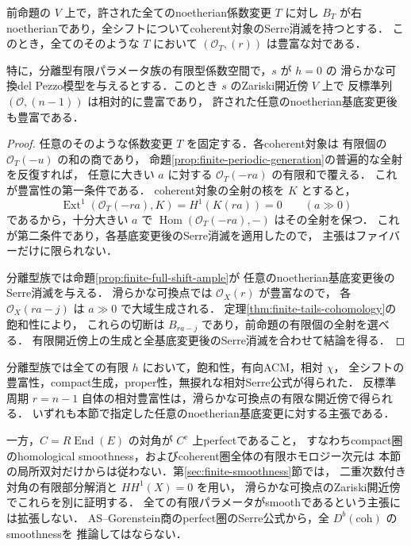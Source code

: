 \begin{corollary}[有限開近傍上の相対反標準豊富性]
\label{cor:finite-periodic-ampleness}
前命題の $V$ 上で，許された全てのnoetherian係数変更 $T$ に対し
$B_T$ が右noetherianであり，全シフトについてcoherent対象のSerre消滅を持つとする．
このとき，全てのそのような $T$ において
$(\mathcal O_T,(r))$ は豊富な対である．

特に，分離型有限パラメータ族の有限型係数空間で，$s$ が $h=0$ の
滑らかな可換del Pezzo模型を与えるとする．このとき $s$ のZariski開近傍 $V$ 上で
反標準列 $(\mathcal O,(n-1))$ は相対的に豊富であり，
許された任意のnoetherian基底変更後も豊富である．
\end{corollary}
\begin{proof}
任意のそのような係数変更 $T$ を固定する．各coherent対象は
有限個の $\mathcal O_T(-u)$ の和の商であり，
命題\ref{prop:finite-periodic-generation}の普遍的な全射を反復すれば，
任意に大きい $a$ に対する $\mathcal O_T(-ra)$ の有限和で覆える．
これが豊富性の第一条件である．
coherent対象の全射の核を $K$ とすると，
\[
 \operatorname{Ext}^1(\mathcal O_T(-ra),K)=H^1(K(ra))=0
 \qquad(a\gg0)
\]
であるから，十分大きい $a$ で
$\operatorname{Hom}(\mathcal O_T(-ra),-)$ はその全射を保つ．
これが第二条件であり，各基底変更後のSerre消滅を適用したので，
主張はファイバーだけに限られない．

分離型族では命題\ref{prop:finite-full-shift-ample}が
任意のnoetherian基底変更後のSerre消滅を与える．
滑らかな可換点では $\mathcal O_X(r)$ が豊富なので，
各 $\mathcal O_X(ra-j)$ は $a\gg0$ で大域生成される．
定理\ref{thm:finite-tails-cohomology}の飽和性により，
これらの切断は $B_{ra-j}$ であり，前命題の有限個の全射を選べる．
有限開近傍上の生成と全基底変更後のSerre消滅を合わせて結論を得る．
\end{proof}

\begin{remark}[有限パラメータ族で得られた条件と残る問題]
\label{rem:finite-tails-scope}
分離型族では全ての有限 $h$ において，飽和性，有向ACM，相対 $\chi$，
全シフトの豊富性，compact生成，proper性，無捩れな相対Serre公式が得られた．
反標準周期 $r=n-1$ 自体の相対豊富性は，滑らかな可換点の有限な開近傍で得られる．
いずれも本節で指定した任意のnoetherian基底変更に対する主張である．

一方，$C=R\!\operatorname{End}(E)$ の対角が $C^{\mathrm e}$ 上perfectであること，
すなわちcompact圏のhomological smoothness，およびcoherent圏全体の有限ホモロジー次元は
本節の局所双対だけからは従わない．第\ref{sec:finite-smoothness}節では，
二重次数付き対角の有限部分解消と $HH^1(X)=0$ を用い，
滑らかな可換点のZariski開近傍でこれらを別に証明する．
全ての有限パラメータがsmoothであるという主張には拡張しない．
AS--Gorenstein商のperfect圏のSerre公式から，全 $D^b(\mathrm{coh})$ のsmoothnessを
推論してはならない．
\end{remark}
